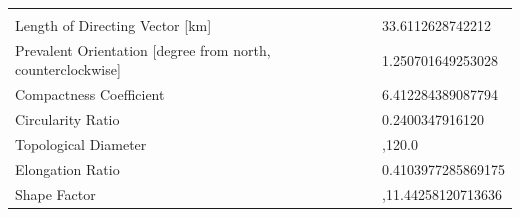 \documentclass[11pt,]{article}
\begin{document}
\begin{longtable}[]{@{}ll@{}}
\begin{minipage}[t]{0.28\columnwidth}
\end{minipage}\tabularnewline
\begin{minipage}[t]{0.66\columnwidth}\raggedright\strut
Length of Directing Vector {[}km{]}\strut
\end{minipage} & \begin{minipage}[t]{0.28\columnwidth}\raggedright\strut
33.6112628742212\strut
\end{minipage}\tabularnewline
\begin{minipage}[t]{0.66\columnwidth}\raggedright\strut
Prevalent Orientation {[}degree from north, counterclockwise{]}\strut
\end{minipage} & \begin{minipage}[t]{0.28\columnwidth}\raggedright\strut
1.250701649253028\strut
\end{minipage}\tabularnewline
\begin{minipage}[t]{0.66\columnwidth}\raggedright\strut
Compactness Coefficient\strut
\end{minipage} & \begin{minipage}[t]{0.28\columnwidth}\raggedright\strut
6.412284389087794\strut
\end{minipage}\tabularnewline
\begin{minipage}[t]{0.66\columnwidth}\raggedright\strut
Circularity Ratio\strut
\end{minipage} & \begin{minipage}[t]{0.28\columnwidth}\raggedright\strut
0.2400347916120\strut
\end{minipage}\tabularnewline
\begin{minipage}[t]{0.66\columnwidth}\raggedright\strut
Topological Diameter\strut
\end{minipage} & \begin{minipage}[t]{0.28\columnwidth}\raggedright\strut
,120.0\strut
\end{minipage}\tabularnewline
\begin{minipage}[t]{0.66\columnwidth}\raggedright\strut
Elongation Ratio\strut
\end{minipage} & \begin{minipage}[t]{0.28\columnwidth}\raggedright\strut
0.4103977285869175\strut
\end{minipage}\tabularnewline
\begin{minipage}[t]{0.66\columnwidth}\raggedright\strut
Shape Factor\strut
\end{minipage} & \begin{minipage}[t]{0.28\columnwidth}\raggedright\strut
,11.44258120713636\strut

\end{minipage}
\end{longtable}
\end{document}
